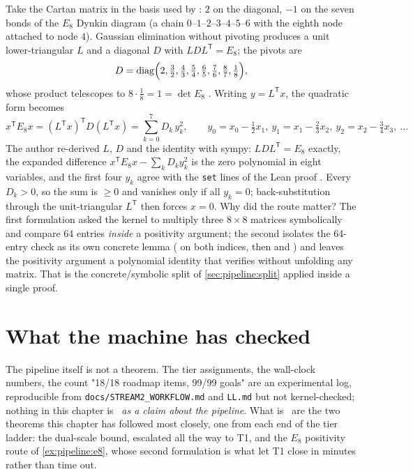 \begin{example}\label{ex:pipeline:e8}
Take the Cartan matrix in the basis used by  :
$2$ on the diagonal, $-1$ on the seven bonds of the $E_8$ Dynkin diagram (a chain
$0$--$1$--$2$--$3$--$4$--$5$--$6$ with the eighth node attached to node $4$). Gaussian
elimination without pivoting produces a unit lower-triangular $L$ and a diagonal $D$ with
$LDL^{\mathsf T}=E_8$; the pivots are
\[
D=\operatorname{diag}\Bigl(2,\tfrac32,\tfrac43,\tfrac54,\tfrac65,\tfrac76,\tfrac87,\tfrac18\Bigr),
\]
whose product telescopes to $8\cdot\tfrac18=1=\det E_8$ . Writing $y=L^{\mathsf T}x$, the quadratic form becomes
\[
x^{\mathsf T}E_8x=(L^{\mathsf T}x)^{\mathsf T}D(L^{\mathsf T}x)=\sum_{k=0}^{7}D_k\,y_k^2,
\qquad y_0=x_0-\tfrac12x_1,\ y_1=x_1-\tfrac23x_2,\ y_2=x_2-\tfrac34x_3,\ \ldots
\]
The author re-derived $L$, $D$ and the identity with sympy: $LDL^{\mathsf T}=E_8$ exactly,
the expanded difference $x^{\mathsf T}E_8x-\sum_kD_ky_k^2$ is the zero polynomial in eight
variables, and the first four $y_k$ agree with the \texttt{set} lines of the Lean proof
. Every $D_k>0$, so the sum is $\ge0$ and vanishes only
if all $y_k=0$; back-substitution through the unit-triangular $L^{\mathsf T}$ then forces
$x=0$. Why did the route matter? The first formulation asked the kernel to multiply three
$8\times8$ matrices symbolically and compare 64 entries \emph{inside} a positivity argument;
the second isolates the 64-entry check as its own concrete lemma 
( on both indices, then  and 
) and leaves the positivity argument a polynomial
identity that  verifies without unfolding any matrix. That is the concrete/symbolic
split of \cref{sec:pipeline:split} applied inside a single proof.
\end{example}

\section{What the machine has checked}\label{sec:pipeline:machine}

The pipeline itself is not a theorem. The tier assignments, the wall-clock numbers, the
count "18/18 roadmap items, 99/99 goals" are an experimental log, reproducible from
\texttt{docs/STREAM2\allowbreak\_WORKFLOW.md} and \texttt{LL.md} but not kernel-checked; nothing in
this chapter is \TA\ \emph{as a claim about the pipeline}. What is \TA\ are the two
theorems this chapter has followed most closely, one from each end of the tier ladder: the
dual-scale bound, escalated all the way to T1, and the \(E_8\) positivity route of
\cref{ex:pipeline:e8}, whose second formulation is what let T1 close in minutes rather than
time out.

